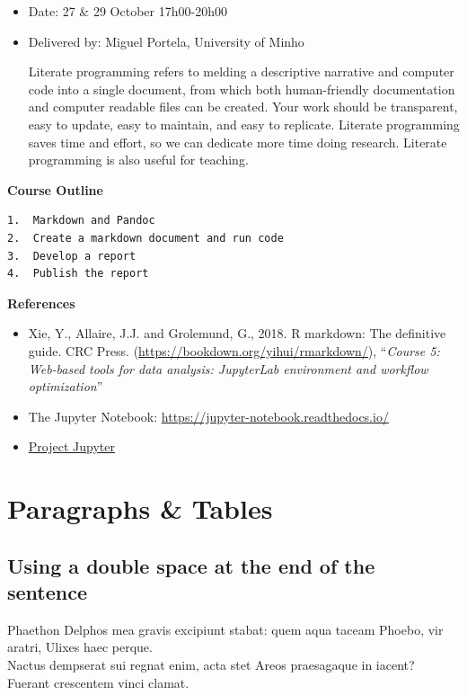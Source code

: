 \documentclass[
]{article}
\begin{document}
\begin{itemize}
\item
  Date: 27 \& 29 October \textbar{} 17h00-20h00
\item
  Delivered by: Miguel Portela, University of Minho

  Literate programming refers to melding a descriptive narrative and
  computer code into a single document, from which both human-friendly
  documentation and computer readable files can be created. Your work
  should be transparent, easy to update, easy to maintain, and easy to
  replicate. Literate programming saves time and effort, so we can
  dedicate more time doing research. Literate programming is also useful
  for teaching.
\end{itemize}

\textbf{Course Outline}

\begin{verbatim}
1.  Markdown and Pandoc
2.  Create a markdown document and run code
3.  Develop a report
4.  Publish the report
\end{verbatim}

\textbf{References}

\begin{itemize}
\item
  Xie, Y., Allaire, J.J. and Grolemund, G., 2018. R markdown: The
  definitive guide. CRC Press.
  (\url{https://bookdown.org/yihui/rmarkdown/}), ``\emph{Course 5:
  Web-based tools for data analysis: JupyterLab environment and workflow
  optimization}''
\item
  The Jupyter Notebook: \url{https://jupyter-notebook.readthedocs.io/}
\item
  \href{https://jupyter.org/}{Project Jupyter}
\end{itemize}

\hypertarget{paragraphs-tables}{%
\section{Paragraphs \& Tables}\label{paragraphs-tables}}

\hypertarget{using-a-double-space-at-the-end-of-the-sentence}{%
\subsection{Using a double space at the end of the
sentence}\label{using-a-double-space-at-the-end-of-the-sentence}}

Phaethon Delphos mea gravis excipiunt stabat: quem aqua taceam Phoebo,
vir aratri, Ulixes haec perque.\\
Nactus dempserat sui regnat enim, acta stet Areos praesagaque in iacent?
Fuerant crescentem vinci clamat.
\end{document}
